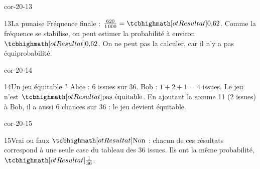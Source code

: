 \begin{blocLivre}{cor-20-13}\begin{corrige}{13}{La punaise}
Fréquence finale : $\frac{620}{1\,000}=\res{0{,}62}$. Comme la fréquence se stabilise, on peut estimer la probabilité à environ $\res{0{,}62}$. On ne peut pas la calculer, car il n’y a pas équiprobabilité.
\label{fig-cor-20-13}
\end{corrige}\end{blocLivre}
\begin{blocLivre}{cor-20-14}\begin{corrige}{14}{Un jeu équitable ?}
Alice : 6 issues sur 36. Bob : $1+2+1=4$ issues. Le jeu n’est $\res{\text{pas équitable}}$. En ajoutant la somme 11 (2 issues) à Bob, il a aussi 6 chances sur 36 : le jeu devient équitable.
\end{corrige}\end{blocLivre}
\begin{blocLivre}{cor-20-15}\begin{corrige}{15}{Vrai ou faux}
$\res{\text{Non}}$ : chacun de ces résultats correspond à une seule case du tableau des 36 issues. Ils ont la même probabilité, $\res{\frac1{36}}$.
\end{corrige}\end{blocLivre}
